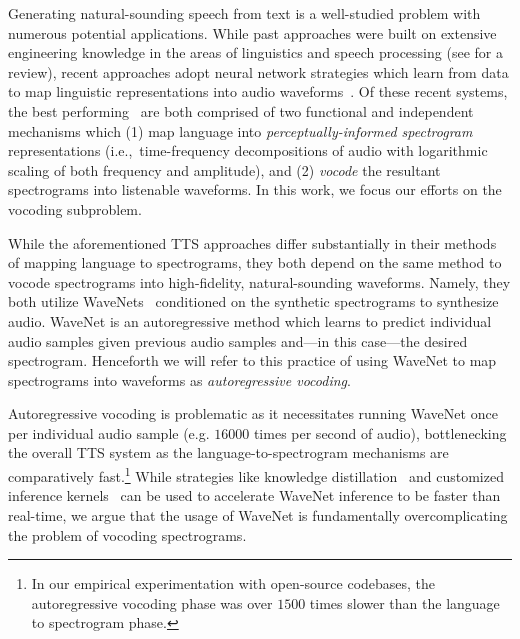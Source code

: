 \documentclass[a4paper]{article}
\begin{document}
Generating natural-sounding speech from text is a well-studied problem with numerous potential applications. 
While past approaches were built on extensive engineering knowledge in the areas of linguistics and speech processing  (see %
\cite{todo} for a review), 
recent approaches adopt neural network strategies which learn from data to map linguistic representations into audio waveforms~\cite{arik2017deep,gibiansky2017deep,ping2017deep,wang2017tacotron,shen2018natural}. 
Of these recent systems, 
the best performing~\cite{ping2017deep,shen2018natural} are both comprised of two functional and independent mechanisms which 
(1) map language into \emph{perceptually-informed spectrogram} representations (i.e.,~time-frequency decompositions of audio with logarithmic scaling of both frequency and amplitude), and 
(2) \emph{vocode} the resultant spectrograms into listenable waveforms. 
In this work, we focus our efforts on the vocoding subproblem.


While the aforementioned TTS approaches differ substantially in their methods of mapping language to spectrograms, they both depend on the same method to vocode spectrograms into high-fidelity, natural-sounding waveforms. 
Namely, they both utilize WaveNets~\cite{oord2016wavenet} conditioned on the synthetic spectrograms to synthesize audio. 
WaveNet is an autoregressive method which learns to predict individual audio samples given previous audio samples and---in this case---the desired spectrogram. 
Henceforth we will refer to this practice of using WaveNet to map spectrograms into waveforms as \emph{autoregressive vocoding}. 

Autoregressive vocoding is problematic as it necessitates running WaveNet once per individual audio sample (e.g. $16000$ times per second of audio), bottlenecking the overall TTS system as the language-to-spectrogram mechanisms are comparatively fast.\footnote{In our empirical experimentation with open-source codebases, the autoregressive vocoding phase was over $1500$ times slower than the language to spectrogram phase.} 
While 
strategies like knowledge distillation~\cite{hinton2015distilling} and customized inference kernels~\cite{arik2017deep} can be used to accelerate WaveNet inference to be faster than real-time, 
we argue that the usage of WaveNet is fundamentally overcomplicating the problem of vocoding spectrograms.
\end{document}
